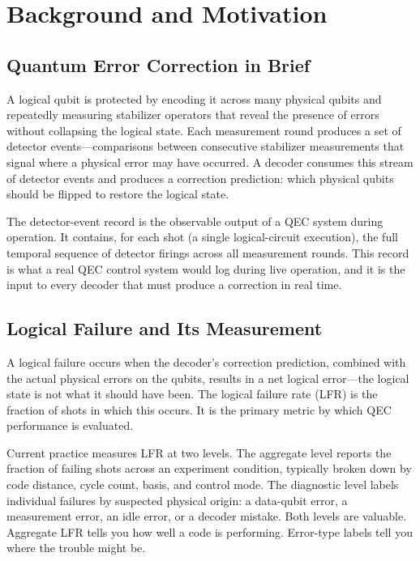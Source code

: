 \section{Background and Motivation}

\subsection{Quantum Error Correction in Brief}

A logical qubit is protected by encoding it across many physical qubits and repeatedly measuring stabilizer operators that reveal the presence of errors without collapsing the logical state. Each measurement round produces a set of detector events---comparisons between consecutive stabilizer measurements that signal where a physical error may have occurred. A decoder consumes this stream of detector events and produces a correction prediction: which physical qubits should be flipped to restore the logical state.

The detector-event record is the observable output of a QEC system during operation. It contains, for each shot (a single logical-circuit execution), the full temporal sequence of detector firings across all measurement rounds. This record is what a real QEC control system would log during live operation, and it is the input to every decoder that must produce a correction in real time.

\subsection{Logical Failure and Its Measurement}

A logical failure occurs when the decoder's correction prediction, combined with the actual physical errors on the qubits, results in a net logical error---the logical state is not what it should have been. The logical failure rate (LFR) is the fraction of shots in which this occurs. It is the primary metric by which QEC performance is evaluated.

Current practice measures LFR at two levels. The aggregate level reports the fraction of failing shots across an experiment condition, typically broken down by code distance, cycle count, basis, and control mode. The diagnostic level labels individual failures by suspected physical origin: a data-qubit error, a measurement error, an idle error, or a decoder mistake. Both levels are valuable. Aggregate LFR tells you how well a code is performing. Error-type labels tell you where the trouble might be.

